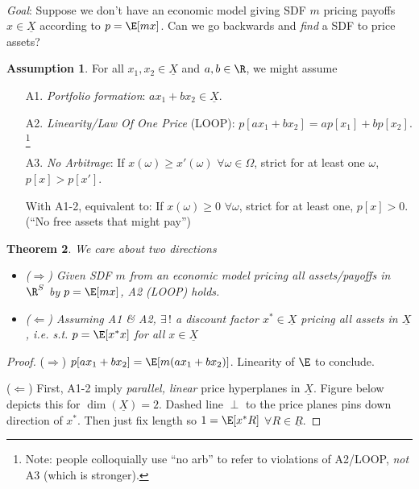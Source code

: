 \documentclass[12pt]{article}
\theoremstyle{plain}
\newtheorem{thm}{Theorem}[section]
\theoremstyle{definition}
\newtheorem{assump}[thm]{Assumption}
\theoremstyle{remark}
\begin{document}
\begin{multicols*}{2}
\\
\emph{Goal}: Suppose we don't have an economic model giving SDF $m$
pricing payoffs $x\in\underline{X}$ according to $p=\E[mx]$.
Can we go backwards and \emph{find} a SDF to price assets?

\begin{assump}
For all $x_1,x_2\in \underline{X}$ and $a,b\in\R$, we might assume
\begin{itemize}
  \item[A1.] \emph{Portfolio formation}:
    $ax_1+bx_2\in\underline{X}$.
  \item[A2.] \emph{Linearity/Law Of One Price} (LOOP):
    $p[ax_1+bx_2] = ap[x_1]+bp[x_2]$.
    \footnote{
      Note: people colloquially use ``no arb'' to refer to
      violations of A2/LOOP, \emph{not} A3 (which is stronger).
    }
  \item[A3.] \emph{No Arbitrage}:
    If $x(\omega)\geq x'(\omega)$ $\forall \omega\in\Omega$,
    strict for at least one $\omega$, $p[x]>p[x']$.

    With A1-2, equivalent to:
    If $x(\omega)\geq 0$ $\forall\omega$,
    strict for at least one, $p[x]>0$.
    (``No free assets that might pay'')
\end{itemize}
\end{assump}

\begin{thm}
We care about two directions
\begin{itemize}
  \item
    \emph{($\Rightarrow$)}
    Given SDF $m$ from an economic model pricing all assets/payoffs in
    $\R^S$ by $p=\E[mx]$, A2 (LOOP) holds.
  \item
    \emph{($\Leftarrow$)}
    Assuming A1 \& A2, $\exists\,!$ a discount factor
    $x^*\in\underline{X}$ pricing all assets in $\underline{X}$,
    i.e. s.t. $p=\E[x^*x]$ for all $x\in\underline{X}$
\end{itemize}
\end{thm}
\begin{proof}
($\Rightarrow$) $p[ax_1+bx_2] = \E[m(ax_1+bx_2)]$. Linearity of
$\E$ to conclude.

($\Leftarrow$) First, A1-2 imply \emph{parallel, linear} price
hyperplanes in $\underline{X}$.
Figure below depicts this for $\dim(\underline{X})=2$.
Dashed line $\perp$ to the price planes
pins down direction of $x^*$.
Then just fix length so $1=\E[x^*R]$ $\forall R\in\underline{R}$.


\end{proof}
\end{multicols*}
\end{document}
